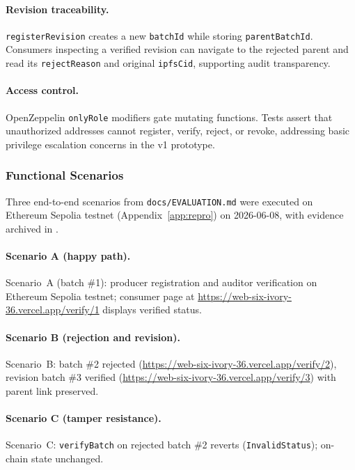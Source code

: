 \paragraph{Revision traceability.}
\texttt{registerRevision} creates a new \texttt{batchId} while storing \texttt{parentBatchId}.
Consumers inspecting a verified revision can navigate to the rejected parent and read its \texttt{rejectReason} and original \texttt{ipfsCid}, supporting audit transparency.

\paragraph{Access control.}
OpenZeppelin \texttt{onlyRole} modifiers gate mutating functions.
Tests assert that unauthorized addresses cannot register, verify, reject, or revoke, addressing basic privilege escalation concerns in the v1 prototype.

\subsubsection{Functional Scenarios}
Three end-to-end scenarios from \texttt{docs/EVALUATION.md} were executed on Ethereum Sepolia testnet (Appendix~\ref{app:repro}) on 2026-06-08, with evidence archived in .

\paragraph{Scenario A (happy path).}
Scenario~A (batch \#1): producer registration and auditor verification on Ethereum Sepolia testnet; consumer page at \url{https://web-six-ivory-36.vercel.app/verify/1} displays verified status.

\paragraph{Scenario B (rejection and revision).}
Scenario~B: batch \#2 rejected (\url{https://web-six-ivory-36.vercel.app/verify/2}), revision batch \#3 verified (\url{https://web-six-ivory-36.vercel.app/verify/3}) with parent link preserved.

\paragraph{Scenario C (tamper resistance).}
Scenario~C: \texttt{verifyBatch} on rejected batch \#2 reverts (\texttt{InvalidStatus}); on-chain state unchanged.

